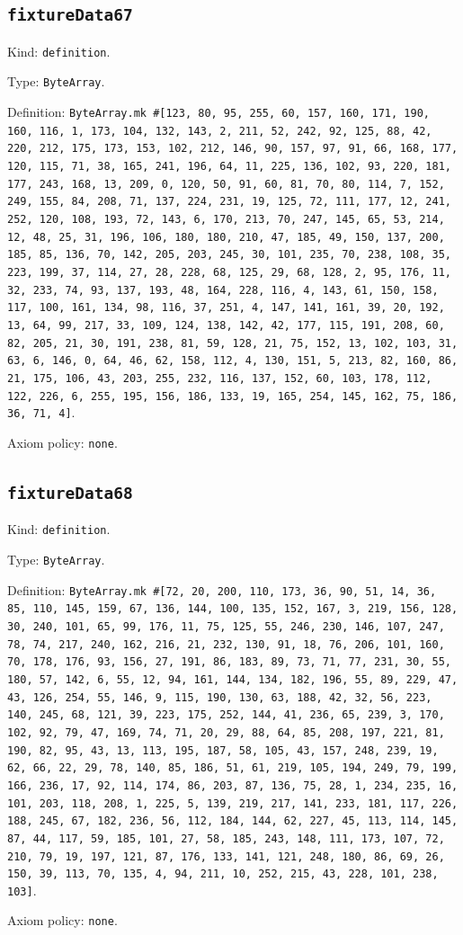 \documentclass[11pt]{article}
\begin{document}
\subsection*{\texttt{fixtureData67}}
\noindent Kind: \texttt{definition}.\par
\noindent Type: \texttt{ByteArray}.\par
\noindent Definition: \texttt{ByteArray.mk \#[123, 80, 95, 255, 60, 157, 160, 171, 190, 160, 116, 1, 173, 104, 132, 143, 2, 211, 52, 242, 92, 125, 88, 42, 220, 212, 175, 173, 153, 102, 212, 146, 90, 157, 97, 91, 66, 168, 177, 120, 115, 71, 38, 165, 241, 196, 64, 11, 225, 136, 102, 93, 220, 181, 177, 243, 168, 13, 209, 0, 120, 50, 91, 60, 81, 70, 80, 114, 7, 152, 249, 155, 84, 208, 71, 137, 224, 231, 19, 125, 72, 111, 177, 12, 241, 252, 120, 108, 193, 72, 143, 6, 170, 213, 70, 247, 145, 65, 53, 214, 12, 48, 25, 31, 196, 106, 180, 180, 210, 47, 185, 49, 150, 137, 200, 185, 85, 136, 70, 142, 205, 203, 245, 30, 101, 235, 70, 238, 108, 35, 223, 199, 37, 114, 27, 28, 228, 68, 125, 29, 68, 128, 2, 95, 176, 11, 32, 233, 74, 93, 137, 193, 48, 164, 228, 116, 4, 143, 61, 150, 158, 117, 100, 161, 134, 98, 116, 37, 251, 4, 147, 141, 161, 39, 20, 192, 13, 64, 99, 217, 33, 109, 124, 138, 142, 42, 177, 115, 191, 208, 60, 82, 205, 21, 30, 191, 238, 81, 59, 128, 21, 75, 152, 13, 102, 103, 31, 63, 6, 146, 0, 64, 46, 62, 158, 112, 4, 130, 151, 5, 213, 82, 160, 86, 21, 175, 106, 43, 203, 255, 232, 116, 137, 152, 60, 103, 178, 112, 122, 226, 6, 255, 195, 156, 186, 133, 19, 165, 254, 145, 162, 75, 186, 36, 71, 4]}.\par
\noindent Axiom policy: \texttt{none}.\par
\subsection*{\texttt{fixtureData68}}
\noindent Kind: \texttt{definition}.\par
\noindent Type: \texttt{ByteArray}.\par
\noindent Definition: \texttt{ByteArray.mk \#[72, 20, 200, 110, 173, 36, 90, 51, 14, 36, 85, 110, 145, 159, 67, 136, 144, 100, 135, 152, 167, 3, 219, 156, 128, 30, 240, 101, 65, 99, 176, 11, 75, 125, 55, 246, 230, 146, 107, 247, 78, 74, 217, 240, 162, 216, 21, 232, 130, 91, 18, 76, 206, 101, 160, 70, 178, 176, 93, 156, 27, 191, 86, 183, 89, 73, 71, 77, 231, 30, 55, 180, 57, 142, 6, 55, 12, 94, 161, 144, 134, 182, 196, 55, 89, 229, 47, 43, 126, 254, 55, 146, 9, 115, 190, 130, 63, 188, 42, 32, 56, 223, 140, 245, 68, 121, 39, 223, 175, 252, 144, 41, 236, 65, 239, 3, 170, 102, 92, 79, 47, 169, 74, 71, 20, 29, 88, 64, 85, 208, 197, 221, 81, 190, 82, 95, 43, 13, 113, 195, 187, 58, 105, 43, 157, 248, 239, 19, 62, 66, 22, 29, 78, 140, 85, 186, 51, 61, 219, 105, 194, 249, 79, 199, 166, 236, 17, 92, 114, 174, 86, 203, 87, 136, 75, 28, 1, 234, 235, 16, 101, 203, 118, 208, 1, 225, 5, 139, 219, 217, 141, 233, 181, 117, 226, 188, 245, 67, 182, 236, 56, 112, 184, 144, 62, 227, 45, 113, 114, 145, 87, 44, 117, 59, 185, 101, 27, 58, 185, 243, 148, 111, 173, 107, 72, 210, 79, 19, 197, 121, 87, 176, 133, 141, 121, 248, 180, 86, 69, 26, 150, 39, 113, 70, 135, 4, 94, 211, 10, 252, 215, 43, 228, 101, 238, 103]}.\par
\noindent Axiom policy: \texttt{none}.\par
\end{document}
